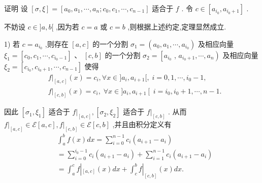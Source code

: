 证明 设 $\left\lbrack  {\sigma ,\xi }\right\rbrack   = \left\lbrack  {{a}_{0},{a}_{1},\cdots ,{a}_{n};{c}_{0},{c}_{1},\cdots ,{c}_{n - 1}}\right\rbrack$ 适合于 $f$ . 令 $c \in  \left\lbrack  {{a}_{{i}_{0}},{a}_{{i}_{0} + 1}}\right\rbrack$ .

不妨设 $c \in  \rbrack a,b\lbrack$ ,因为若 $c = a$ 或 $c = b$ ,则根据上述约定,定理显然成立.

1) 若 $c = {a}_{{i}_{0}}$ ,则存在 $\left\lbrack  {a,c}\right\rbrack$ 的一个分割 ${\sigma }_{1} = \left( {{a}_{0},{a}_{1},\cdots ,{a}_{{i}_{0}}}\right)$ 及相应向量 ${\xi }_{1} = \left\lbrack  {{c}_{0},{c}_{1},\cdots ,{c}_{{i}_{0} - 1}}\right\rbrack  \text{ 、 }\left\lbrack  {c,b}\right\rbrack$ 的一个分割 ${\sigma }_{2} = \left\lbrack  {a}_{{i}_{0}}\right.$ , $\left. {{a}_{{i}_{0} + 1},\cdots ,{a}_{n}}\right)$ 及相应向量 ${\xi }_{2} = \left\lbrack  {{c}_{{i}_{0}},{c}_{{i}_{0} + 1},\cdots ,{c}_{n - 1}}\right\rbrack$ 使得
\begin{align*}
	&{\left. f\right| }_{\left\lbrack  a,c\right\rbrack  }\left( x\right)  = {c}_{i},\forall x \in  \rbrack {a}_{i},{a}_{i + 1}\lbrack ,\;i = 0,1,\cdots ,{i}_{0} - 1,\\
	&{\left. f\right| }_{\left\lbrack  c,b\right\rbrack  }\left( x\right)  = {c}_{i},\;\forall x \in  \rbrack {a}_{i},{a}_{i + 1}\left\lbrack  {\;i = {i}_{0},{i}_{0} + 1,\cdots ,n - 1.}\right.
\end{align*}

因此 $\left\lbrack  {{\sigma }_{1},{\xi }_{1}}\right\rbrack$ 适合于 $f{|}_{\left\lbrack  a,c\right\rbrack  },\left\lbrack  {{\sigma }_{2},{\xi }_{2}}\right\rbrack$ 适合于 $f{|}_{\left\lbrack  c,b\right\rbrack  }$ . 从而 ${\left. f\right| }_{\left\lbrack  a,c\right\rbrack  } \in  \mathcal{E}\left\lbrack  {a,c}\right\rbrack  ,{\left. f\right| }_{\left\lbrack  c,b\right\rbrack  } \in  \mathcal{E}\left\lbrack  {c,b}\right\rbrack$ ,并且由积分定义有
\begin{align*}
	&{\int }_{a}^{b}f\left( x\right) {dx} = \mathop{\sum }\limits_{{i = 0}}^{{n - 1}}{c}_{i}\left( {{a}_{i + 1} - {a}_{i}}\right)\\
	&= \mathop{\sum }\limits_{{i = 0}}^{{{i}_{0} - 1}}{c}_{i}\left( {{a}_{i + 1} - {a}_{i}}\right)  + \mathop{\sum }\limits_{{i = 1}}^{{n - 1}}{c}_{i}\left( {{a}_{i + 1} - {a}_{i}}\right)\\
	&= {\int }_{a}^{c}f{\left| {}_{\left\lbrack  a,c\right\rbrack  }\left( x\right) dx + {\int }_{c}^{b}f\right| }_{\left\lbrack  c,b\right\rbrack  }\left( x\right) {dx}.
\end{align*}

